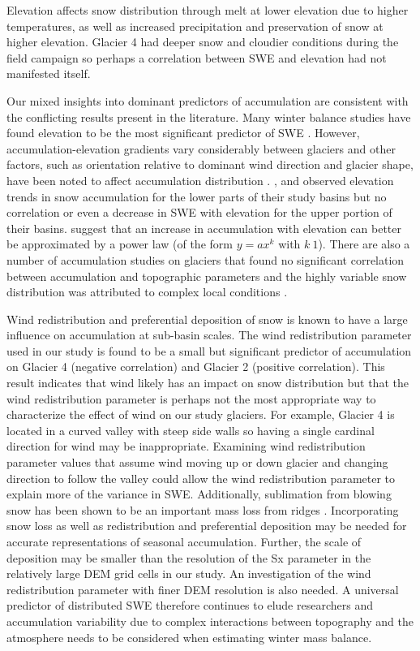 \documentclass[twocolumn, letterpaper]{igs}
\begin{document}
Elevation affects snow distribution through melt at lower elevation due to higher temperatures, as well as increased precipitation and preservation of snow at higher elevation. Glacier 4 had deeper snow and cloudier conditions during the field campaign so perhaps a correlation between SWE and elevation had not manifested itself. 

Our mixed insights into dominant predictors of accumulation are consistent with the conflicting results present in the literature. Many winter balance studies have found elevation to be the most significant predictor of SWE \citep[e.g.][]{Machguth2006, McGrath2015}. However, accumulation-elevation gradients vary considerably between glaciers \citep{Winther1998} and other factors, such as orientation relative to dominant wind direction and glacier shape, have been noted to affect accumulation distribution \citep{Machguth2006,Grabiec2011}.  \cite{Machguth2006}, \cite{Grunewald2014} and \cite{Kirchner2014} observed elevation trends in snow accumulation for the lower parts of their study basins but no correlation or even a decrease in SWE with elevation for the upper portion of their basins. \cite{Helbig2017} suggest that an increase in accumulation with elevation can better be approximated by a power law (of the form $y=ax^k$ with $k\>1$). There are also a number of accumulation studies on glaciers that found no significant correlation between accumulation and topographic parameters and the highly variable snow distribution was attributed to complex local conditions \citep[e.g.][]{Grabiec2011,Lopez2011}.

Wind redistribution and preferential deposition of snow is known to have a large influence on accumulation at sub-basin scales\citep{Dadic2010, Winstral2013}. The wind redistribution parameter used in our study is found to be a small but significant predictor of accumulation on Glacier 4 (negative correlation) and Glacier 2 (positive correlation). This result indicates that wind likely has an impact on snow distribution but that the wind redistribution parameter is perhaps not the most appropriate way to characterize the effect of wind on our study glaciers. For example, Glacier 4 is located in a curved valley with steep side walls so having a single cardinal direction for wind may be inappropriate. Examining wind redistribution parameter values that assume wind moving up or down glacier and changing direction to follow the valley could allow the wind redistribution parameter to explain more of the variance in SWE. Additionally, sublimation from blowing snow has been shown to be an important mass loss from ridges \citep{Musselman2015}. Incorporating snow loss as well as redistribution and preferential deposition may be needed for accurate representations of seasonal accumulation. Further, the scale of deposition may be smaller than the resolution of the Sx parameter in the relatively large DEM grid cells in our study. An investigation of the wind redistribution parameter with finer DEM resolution is also needed. A universal predictor of distributed SWE therefore continues to elude researchers and accumulation variability due to complex interactions between topography and the atmosphere needs to be considered when estimating winter mass balance. 
\end{document}
